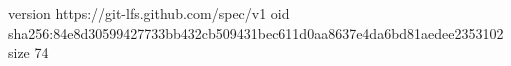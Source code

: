version https://git-lfs.github.com/spec/v1
oid sha256:84e8d30599427733bb432cb509431bec611d0aa8637e4da6bd81aedee2353102
size 74
